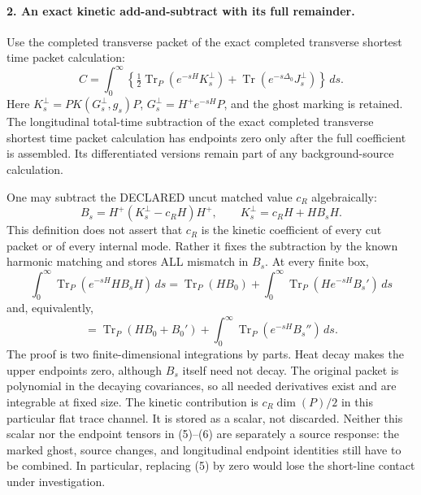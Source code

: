 \documentclass[11pt]{article}
\begin{document}
\paragraph{2. An exact kinetic add-and-subtract with its full remainder.}
Use the completed transverse packet of the exact completed transverse shortest time packet calculation:
\[
 C=\int_0^\infty\left\{\tfrac12\operatorname{Tr}_P
             (e^{-sH}K_s^\perp)+\operatorname{Tr}
             (e^{-s\Delta_0}J_s^\perp)\right\}\,ds.             \tag{3}
\]
Here $K_s^\perp=PK(G_s^\perp,g_s)P$,
$G_s^\perp=H^+e^{-sH}P$, and the ghost marking is retained.
The longitudinal total-time subtraction of the exact completed transverse shortest time packet calculation has endpoints zero only
after the full coefficient is assembled. Its differentiated versions
remain part of any background-source calculation.

One may subtract the DECLARED uncut matched value $c_R$ algebraically:
\[
 B_s=H^+(K_s^\perp-c_RH)H^+,
 \qquad K_s^\perp=c_RH+HB_sH.                              \tag{4}
\]
This definition does not assert that $c_R$ is the kinetic coefficient
of every cut packet or of every internal mode. Rather it fixes the
subtraction by the known harmonic matching and stores ALL mismatch in
$B_s$. At every finite box,
\[
 \int_0^\infty\operatorname{Tr}_P(e^{-sH}HB_sH)\,ds
 =\operatorname{Tr}_P(HB_0)
       +\int_0^\infty\operatorname{Tr}_P(He^{-sH}B_s')\,ds       \tag{5}
\]
and, equivalently,
\[
 =\operatorname{Tr}_P(HB_0+B_0')
       +\int_0^\infty\operatorname{Tr}_P(e^{-sH}B_s'')\,ds.    \tag{6}
\]
The proof is two finite-dimensional integrations by parts. Heat decay
makes the upper endpoints zero, although $B_s$ itself need not decay.
The original packet is polynomial in the decaying covariances, so all
needed derivatives exist and are integrable at fixed size.
The kinetic contribution is $c_R\dim(P)/2$ in this particular flat
trace channel. It is stored as a scalar, not discarded. Neither this
scalar nor the endpoint tensors in (5)--(6) are separately a source
response: the marked ghost, source changes, and longitudinal endpoint
identities still have to be combined. In particular, replacing (5) by
zero would lose the short-line contact under investigation.
\end{document}
